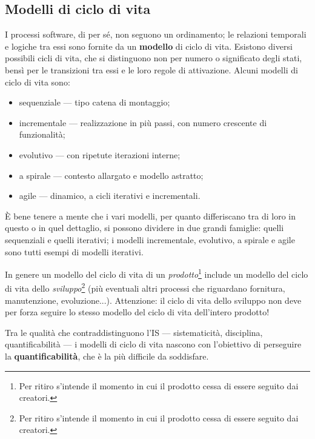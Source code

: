 \documentclass[a4paper]{article}
\begin{document}
		
	\subsection{Modelli di ciclo di vita}

		
I processi software, di per sé, non seguono un ordinamento; le relazioni temporali e logiche tra essi sono fornite da un \textbf{modello} di ciclo di vita. Esistono diversi possibili cicli di vita, che si distinguono non per numero o significato degli stati, bensì per le transizioni tra essi e le loro regole di attivazione. Alcuni modelli di ciclo di vita sono:
		
	\begin{itemize}
		
			
	\item sequenziale --- tipo catena di montaggio;
			
	\item incrementale --- realizzazione in più passi, con numero crescente di funzionalità;
			
	\item evolutivo --- con ripetute iterazioni interne;
			
	\item a spirale --- contesto allargato e modello astratto;
			
	\item agile --- dinamico, a cicli iterativi e incrementali.
		
	\end{itemize}

		
È bene tenere a mente che i vari modelli, per quanto differiscano tra di loro in questo o in quel dettaglio, si possono dividere in due grandi famiglie: quelli sequenziali e quelli iterativi; i modelli incrementale, evolutivo, a spirale e agile sono tutti esempi di modelli iterativi.
		
In genere un modello del ciclo di vita di un \emph{prodotto}\footnote{Per ritiro s'intende il momento in cui il prodotto cessa di essere seguito dai creatori.} include un modello del ciclo di vita dello \emph{sviluppo}\footnote{Per ritiro s'intende il momento in cui il prodotto cessa di essere seguito dai creatori.} (più eventuali altri processi che riguardano fornitura, manutenzione, evoluzione...). Attenzione: il ciclo di vita dello sviluppo non deve per forza seguire lo stesso modello del ciclo di vita dell'intero prodotto!
		
Tra le qualità che contraddistinguono l'IS --- sistematicità, disciplina, quantificabilità --- i modelli di ciclo di vita nascono con l'obiettivo di perseguire la \textbf{quantificabilità}, che è la più difficile da soddisfare.
\end{document}
